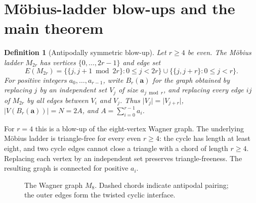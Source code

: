\documentclass[11pt,a4paper]{article}
\newtheorem{definition}[theorem]{Definition}
\newcommand{\card}[1]{\lvert#1\rvert}
\begin{document}
\section{M\"obius-ladder blow-ups and the main theorem}
\begin{definition}[Antipodally symmetric blow-up]\label{def:blow}
Let $r\ge4$ be even. The M\"obius ladder $M_{2r}$ has vertices $\{0,\ldots,2r-1\}$ and edge set
\[
 E(M_{2r})=\big\{\{j,j+1\bmod 2r\}:0\le j<2r\big\}
 \cup\big\{\{j,j+r\}:0\le j<r\big\}.
\]
For positive integers $a_0,\ldots,a_{r-1}$, write $B_r(\mathbf a)$ for the graph obtained by replacing $j$ by an independent set $V_j$ of size $a_{j\bmod r}$, and replacing every edge $ij$ of $M_{2r}$ by all edges between $V_i$ and $V_j$. Thus $\card{V_j}=\card{V_{j+r}}$, $\card{V(B_r(\mathbf a))}=N=2A$, and $A=\sum_{i=0}^{r-1}a_i$.
\end{definition}
For $r=4$ this is a blow-up of the eight-vertex Wagner graph. The underlying M\"obius ladder is triangle-free for every even $r\ge4$: the cycle has length at least eight, and two cycle edges cannot close a triangle with a chord of length $r\ge4$. Replacing each vertex by an independent set preserves triangle-freeness. The resulting graph is connected for positive $a_i$.

\begin{figure}[ht]
\centering
{}
\caption{The Wagner graph $M_8$. Dashed chords indicate antipodal pairing; the outer edges form the twisted cyclic interface.}
\label{fig:wagner}
\end{figure}
\end{document}
